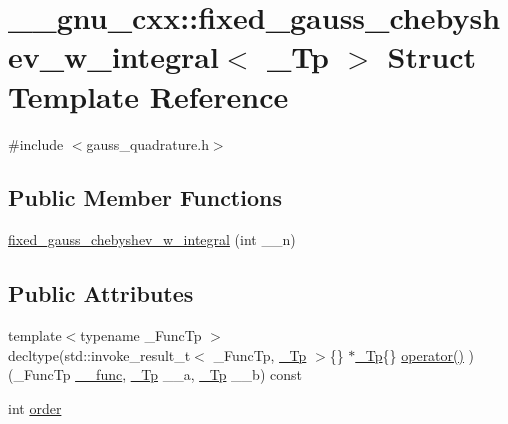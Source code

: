 \hypertarget{struct____gnu__cxx_1_1fixed__gauss__chebyshev__w__integral}{}\section{\+\_\+\+\_\+gnu\+\_\+cxx\+:\+:fixed\+\_\+gauss\+\_\+chebyshev\+\_\+w\+\_\+integral$<$ \+\_\+\+Tp $>$ Struct Template Reference}
\label{struct____gnu__cxx_1_1fixed__gauss__chebyshev__w__integral}


{\ttfamily \#include $<$gauss\+\_\+quadrature.\+h$>$}

\subsection*{Public Member Functions}
\begin{DoxyCompactItemize}
\item 
\hyperlink{struct____gnu__cxx_1_1fixed__gauss__chebyshev__w__integral_a2b104180bab0cc9ffbd5b1d1644baff5}{fixed\+\_\+gauss\+\_\+chebyshev\+\_\+w\+\_\+integral} (int \+\_\+\+\_\+n)
\end{DoxyCompactItemize}
\subsection*{Public Attributes}
\begin{DoxyCompactItemize}
\item 
{\footnotesize template$<$typename \+\_\+\+Func\+Tp $>$ }\\decltype(std\+::invoke\+\_\+result\+\_\+t$<$ \+\_\+\+Func\+Tp, \hyperlink{namespace____gnu__cxx_a3b19a9c800ca194374ef9172290f7d79}{\+\_\+\+Tp} $>$\{\} $\ast$\hyperlink{namespace____gnu__cxx_a3b19a9c800ca194374ef9172290f7d79}{\+\_\+\+Tp}\{\} \hyperlink{struct____gnu__cxx_1_1fixed__gauss__chebyshev__w__integral_a4edc668031c2cf7ac499d4096d675f33}{operator()} )(\+\_\+\+Func\+Tp \hyperlink{namespace____gnu__cxx_af2b2f0c7a2ae72b922b1afefae5a65b2}{\+\_\+\+\_\+func}, \hyperlink{namespace____gnu__cxx_a3b19a9c800ca194374ef9172290f7d79}{\+\_\+\+Tp} \+\_\+\+\_\+a, \hyperlink{namespace____gnu__cxx_a3b19a9c800ca194374ef9172290f7d79}{\+\_\+\+Tp} \+\_\+\+\_\+b) const
\item 
int \hyperlink{struct____gnu__cxx_1_1fixed__gauss__chebyshev__w__integral_a5e530e42d3634af232d18ad5d95914c9}{order}
\end{DoxyCompactItemize}


